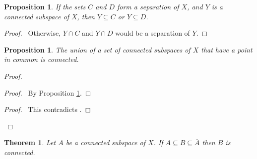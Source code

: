 \documentclass{report}
\let\qed\relax
\newtheorem{prop}[lm]{Proposition}
\newtheorem{thm}[lm]{Theorem}
\theoremstyle{definition}
\begin{document}
  \begin{prop}
    \label{prop:topology:connected:separation_subspace}
    If the sets $C$ and $D$ form a separation of $X$, and $Y$ is a connected
    subspace of $X$, then $Y \subseteq C$ or $Y \subseteq D$.
  \end{prop}

  \begin{proof}
    \pf\ Otherwise, $Y \cap C$ and $Y \cap D$ would be a separation of $Y$. \qed
  \end{proof}

  \begin{prop}
    \label{prop:topology:connected:union}
    The union of a set of connected subspaces of $X$ that have a point in
    common
    is connected.
  \end{prop}

  \begin{proof}
    \pf
    \begin{proof}
      \pf\ By Proposition \ref{prop:topology:connected:separation_subspace}.
    \end{proof}
    \qedstep
    \begin{proof}
      \pf\ This contradicts .
    \end{proof}
    \qed
  \end{proof}

  \begin{thm}
    \label{thm:topology:connected:closure}
    Let $A$ be a connected subspace of $X$. If $A \subseteq B \subseteq
    \overline{A}$ then $B$ is connected.
  \end{thm}
\end{document}
